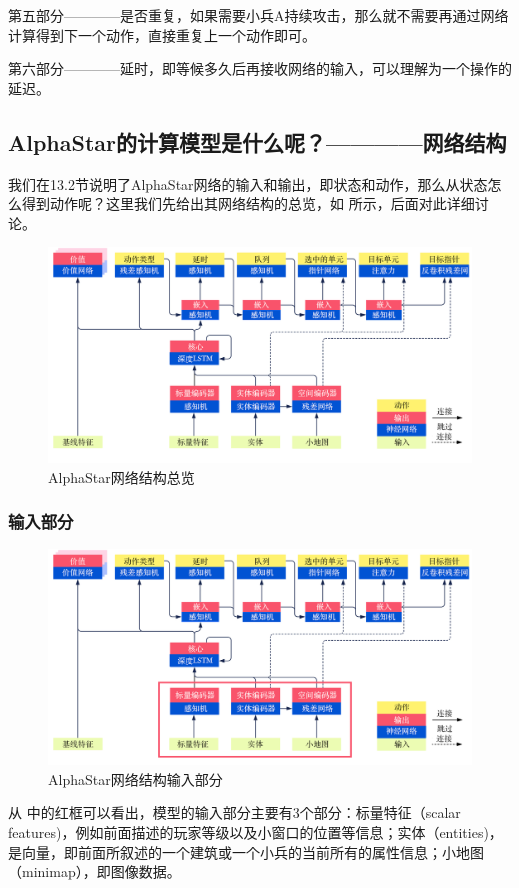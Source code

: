 第五部分————是否重复，如果需要小兵A持续攻击，那么就不需要再通过网络计算得到下一个动作，直接重复上一个动作即可。

第六部分————延时，即等候多久后再接收网络的输入，可以理解为一个操作的延迟。

\subsection{AlphaStar的计算模型是什么呢？————网络结构} 

我们在13.2节说明了AlphaStar网络的输入和输出，即状态和动作，那么从状态怎么得到动作呢？这里我们先给出其网络结构的总览，如 所示，后面对此详细讨论。

\begin{figure}[htb]
    \centering
    \includegraphics[width=0.7\linewidth]{res/ch13/13.3}
    \caption{AlphaStar网络结构总览}
    \label{fig:13_3}
\end{figure}

\subsubsection{输入部分} 

\begin{figure}[htb]
    \centering
    \includegraphics[width=0.7\linewidth]{res/ch13/13.4}
    \caption{AlphaStar网络结构输入部分}
    \label{fig:13_4}
\end{figure}

从 中的红框可以看出，模型的输入部分主要有3个部分：标量特征（scalar features)，例如前面描述的玩家等级以及小窗口的位置等信息；实体（entities)，是向量，即前面所叙述的一个建筑或一个小兵的当前所有的属性信息；小地图（minimap），即图像数据。

